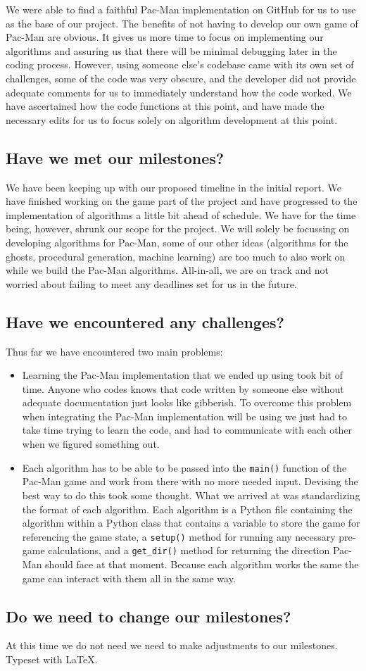 \documentclass[12pt]{article}
\begin{document}
      We were able to find a faithful Pac-Man implementation on GitHub for us to use as the base of our project. The benefits of not having to develop our own game of Pac-Man are obvious. It gives us more time to focus on implementing our algorithms and assuring us that there will be minimal debugging later in the coding process. However, using someone else's codebase came with its own set of challenges, some of the code was very obscure, and the developer did not provide adequate comments for us to immediately understand how the code worked. We have ascertained how the code functions at this point, and have made the necessary edits for us to focus solely on algorithm development at this point.
    \subsection*{Have we met our milestones?}
      We have been keeping up with our proposed timeline in the initial report. We have finished working on the game part of the project and have progressed to the implementation of algorithms a little bit ahead of schedule. We have for the time being, however, shrunk our scope for the project. We will solely be focussing on developing algorithms for Pac-Man, some of our other ideas (algorithms for the ghosts, procedural generation, machine learning) are too much to also work on while we build the Pac-Man algorithms. All-in-all, we are on track and not worried about failing to meet any deadlines  set for us in the future.
    \subsection*{Have we encountered any challenges?}
      Thus far we have encountered two main problems:
      \begin{itemize}
        \item Learning the Pac-Man implementation that we ended up using took bit of time. Anyone who codes knows that code written by someone else without adequate documentation just looks like gibberish. To overcome this problem when integrating the Pac-Man implementation will be using we just had to take time trying to learn the code, and had to communicate with each other when we figured something out.
        \item Each algorithm has to be able to be passed into the \texttt{main()} function of the Pac-Man game and work from there with no more needed input. Devising the best way to do this took some thought. What we arrived at was standardizing the format of each algorithm. Each algorithm is a Python file containing the algorithm within a Python class that contains a variable to store the game for referencing the game state, a \texttt{setup()} method for running any necessary pre-game calculations, and a \texttt{get\_dir()} method for returning the direction Pac-Man should face at that moment. Because each algorithm works the same the game can interact with them all in the same way.
      \end{itemize} 
    \subsection*{Do we need to change our milestones?}
      At this time we do not need we need to make adjustments to our milestones.
  \vfill
  Typeset with \LaTeX.
\end{document}
